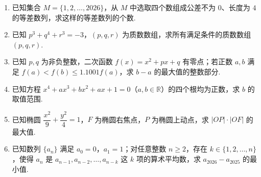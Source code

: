 \documentclass[a4paper,11pt]{report}
\begin{document}
\begin{enumerate}
    \item 已知集合 $M=\{1,2,\ldots,2026\}$，从 $M$ 中选取四个数组成公差不为 $0$、长度为 $4$ 的等差数列，求这样的等差数列的个数. 

    \item 已知 $p^3+q^4+r^3=-3$，$(p,q,r)$ 为质数数组，求所有满足条件的质数数组 $(p,q,r)$. 

    \item 已知 $p,q$ 为非负整数，二次函数 $f(x)=x^2+px+q$ 有零点；若正数 $a,b$ 满足 $f(a)<f(b)\leq 1.1001f(a)$，求 $b-a$ 的最大值的整数部分. 

    \item 已知方程 $x^4+ax^3+bx^2+ax+1=0$（$a,b\in\mathbb{R}$）的四个根均为正数，求 $b$ 的取值范围. 

    \item 已知椭圆 $\dfrac{x^2}{9}+\dfrac{y^2}{4}=1$，$F$ 为椭圆右焦点，$P$ 为椭圆上动点，求 $|OP|\cdot |OF|$ 的最大值. 

    \item 已知数列 $\{a_n\}$ 满足 $a_0=0$，$a_1=1$；对任意整数 $n\geq 2$，存在 $k\in\{1,2,\ldots,n\}$，使得 $a_n$ 是 $a_{n-1},a_{n-2},\ldots,a_{n-k}$ 这 $k$ 项的算术平均数，求 $a_{2026}-a_{2025}$ 的最小值. 
\end{enumerate}
\end{document}
